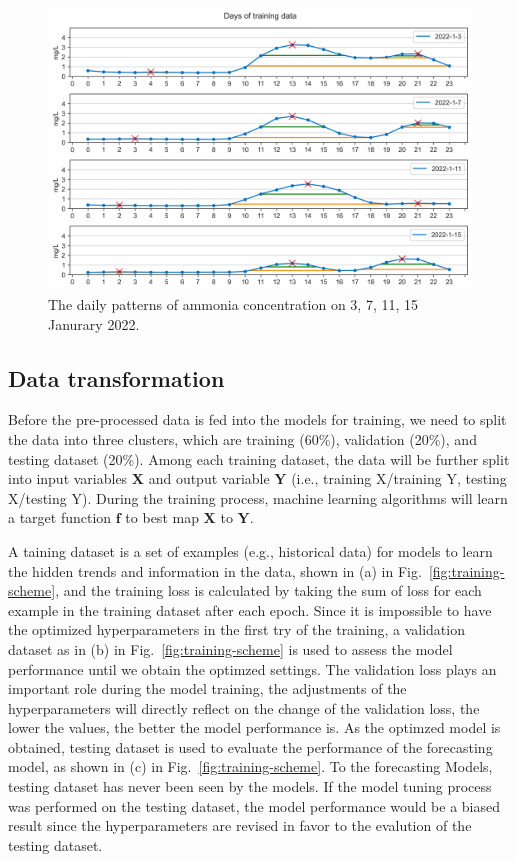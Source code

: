 \begin{figure}[h]
  \centering
  \includegraphics[width=0.8\columnwidth]{imgs/results/nh3-pattern.png}
  \caption{The daily patterns of ammonia concentration on 3, 7, 11, 15 Janurary 2022.}
  \label{fig:nh3-peak-pattern}
\end{figure}

\subsection{Data transformation}
Before the pre-processed data is fed into the models for training, we need to split the data into three clusters, which are training (60\%), validation (20\%), and testing dataset (20\%). Among each training dataset, the data will be further split into input variables $\bm{X}$ and output variable $\bm{Y}$ (i.e., training X/training Y, testing X/testing Y). During the training process, machine learning algorithms will learn a target function $\bm{f}$ to best map $\bm{X}$ to $\bm{Y}$. 

A taining dataset is a set of examples (e.g., historical data) for models to learn the hidden trends and information in the data, shown in (a) in Fig.~\ref{fig:training-scheme}, and the training loss is calculated by taking the sum of loss for each example in the training dataset after each epoch. Since it is impossible to have the optimized hyperparameters in the first try of the training, a validation dataset as in (b) in Fig.~\ref{fig:training-scheme} is used to assess the model performance until we obtain the optimzed settings. The validation loss plays an important role during the model training, the adjustments of the hyperparameters will directly reflect on the change of the validation loss, the lower the values, the better the model performance is. As the optimzed model is obtained, testing dataset is used to evaluate the performance of the forecasting model, as shown in (c) in Fig.~\ref{fig:training-scheme}. To the forecasting Models, testing dataset has never been seen by the models. If the model tuning process was performed on the testing dataset, the model performance would be a biased result since the hyperparameters are revised in favor to the evalution of the testing dataset.

